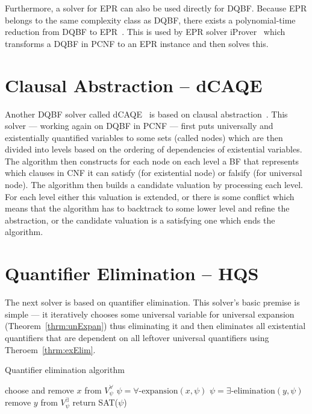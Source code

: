 \documentclass[
  digital, %
  twoside, %
  table,   %
  nolof,     %
  nolot,     %
]{fithesis3}
\theoremstyle{definition}
\theoremstyle{remark}
\newcommand{\evars}[1]{V_{#1}^{\exists}}
\newcommand{\uvars}[1]{V_{#1}^{\forall}}
\begin{document}
Furthermore, a solver for EPR can also be used directly for DQBF. Because EPR belongs to the same complexity class as DQBF, there exists a polynomial-time reduction from DQBF to EPR~\cite{iDQandDQDIMACS}. This is used by EPR solver iProver~\cite{iProver} which transforms a DQBF in PCNF to an EPR instance and then solves this. %

\section{Clausal Abstraction -- dCAQE}
Another DQBF solver called dCAQE~\cite{dCAQE} is based on clausal abstraction~\cite{ClausalAbstr}. This solver --- working again on DQBF in PCNF --- first puts universally and existentially quantified variables to some sets (called nodes) which are then divided into levels based on the ordering of dependencies of existential variables. The algorithm then constructs for each node on each level a BF that represents which clauses in CNF it can satisfy (for existential node) or falsify (for universal node). The algorithm then builds a candidate valuation by processing each level. For each level either this valuation is extended, or there is some conflict which means that the algorithm has to backtrack to some lower level and refine the abstraction, or the candidate valuation is a satisfying one which ends the algorithm.


\section{Quantifier Elimination -- HQS}
The next solver is based on quantifier elimination. This solver's basic premise is simple --- it iteratively chooses some universal variable for universal expansion (Theorem~\ref{thrm:unExpan}) thus eliminating it and then eliminates all existential quantifiers that are dependent on all leftover universal quantifiers using Theroem~\ref{thrm:exElim}.

\begin{algorithm}
\caption{Quantifier elimination algorithm}
\label{alg:QE}
\begin{algorithmic}[1]
\While{$\uvars{\psi}$ is not empty}%
    \State choose and remove $x$ from $\uvars{\psi}$
    \State $\psi = \forall\text{-expansion}(x,\psi)$%
    \ForAll{$y \in \evars{\psi}$ s. t. $D_y = \uvars{\psi}$} %
        \State $\psi = \exists\text{-elimination}(y,\psi)$%
        \State remove $y$ from $\evars{\psi}$
    \EndFor
\EndWhile
\State return SAT($\psi$)
\EndFunction
\end{algorithmic}
\end{algorithm}
\end{document}
